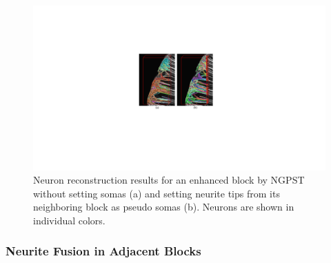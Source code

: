 \begin{figure}[t]
	\centering
	\includegraphics[width=0.9\columnwidth]{./Illustrations/ngpst_pseudosoma.pdf}
	\caption{Neuron reconstruction results for an enhanced block by NGPST without setting somas (a) and setting neurite tips from its neighboring block as pseudo somas (b). Neurons are shown in individual colors. }
	\label{fig:ngpst_pseudosoma}
\end{figure}



\subsubsection{Neurite Fusion in Adjacent Blocks}
\label{sec:fusion}


